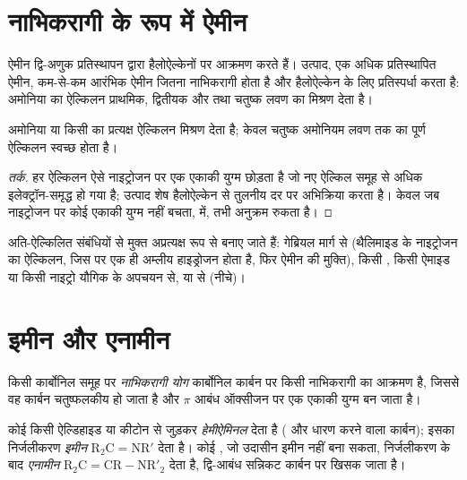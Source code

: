 \section{नाभिकरागी के रूप में ऐमीन}

ऐमीन द्वि-अणुक प्रतिस्थापन द्वारा हैलोऐल्केनों पर आक्रमण करते हैं। उत्पाद, एक अधिक प्रतिस्थापित
ऐमीन, कम-से-कम आरंभिक ऐमीन जितना नाभिकरागी होता है और हैलोऐल्केन के लिए प्रतिस्पर्धा करता है:
अमोनिया का ऐल्किलन प्राथमिक, द्वितीयक और  तथा
चतुष्क लवण का मिश्रण देता है।

\begin{proposition}[बहु-ऐल्किलन]\label{prop:b2:amines:polyalkylation}
अमोनिया या किसी  का प्रत्यक्ष ऐल्किलन मिश्रण देता है; केवल चतुष्क
अमोनियम लवण तक का पूर्ण ऐल्किलन स्वच्छ होता है।
\end{proposition}

\begin{proof}[तर्क]
हर ऐल्किलन ऐसे नाइट्रोजन पर एक एकाकी युग्म छोड़ता है जो नए ऐल्किल समूह से अधिक
इलेक्ट्रॉन-समृद्ध हो गया है; उत्पाद शेष हैलोऐल्केन से तुलनीय दर पर अभिक्रिया करता है। केवल जब
नाइट्रोजन पर कोई एकाकी युग्म नहीं बचता,  में, तभी अनुक्रम रुकता है।
\end{proof}

अति-ऐल्किलित संबंधियों से मुक्त  अप्रत्यक्ष रूप से बनाए जाते हैं: गेब्रियल
मार्ग से (थैलिमाइड के नाइट्रोजन का ऐल्किलन, जिस पर एक ही अम्लीय हाइड्रोजन होता है, फिर
ऐमीन की मुक्ति), किसी , किसी ऐमाइड या किसी नाइट्रो यौगिक के अपचयन से, या
 से (नीचे)।

\section{इमीन और एनामीन}

\begin{definition}[नाभिकरागी योग]\label{def:b2:amines:nucleophilic-addition}
किसी कार्बोनिल समूह पर \emph{नाभिकरागी योग} कार्बोनिल कार्बन पर
किसी नाभिकरागी का आक्रमण है, जिससे वह कार्बन चतुष्फलकीय हो जाता है और  $\pi$ आबंध
ऑक्सीजन पर एक एकाकी युग्म बन जाता है।
\end{definition}

\begin{definition}[हेमीऐमिनल, इमीन और एनामीन]\label{def:b2:amines:imine}
कोई  किसी ऐल्डिहाइड या कीटोन से जुड़कर \emph{हेमीऐमिनल}
देता है ( और  धारण करने वाला कार्बन); इसका निर्जलीकरण \emph{इमीन}
$\mathrm{R_2C{=}NR'}$ देता है। कोई , जो उदासीन इमीन नहीं बना सकता, निर्जलीकरण के बाद
\emph{एनामीन} $\mathrm{R_2C{=}CR{-}NR'_2}$ देता है, द्वि-आबंध सन्निकट कार्बन पर खिसक जाता है।
\end{definition}

